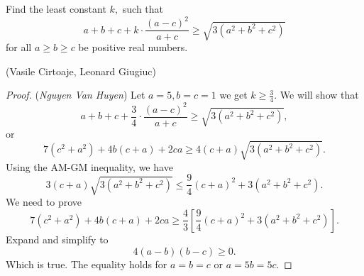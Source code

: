 \documentclass[12pt,a4paper]{book}
\begin{document}
\begin{pro_no_count}
Find the least constant $k,$ such that
$$a+b+c+k\cdot\frac{(a-c)^2}{a+c}\geq \sqrt{3(a^2+b^2+c^2)}$$
for all $a\ge b\ge c$ be positive real numbers.
\begin{flushright}(Vasile Cirtoaje, Leonard Giugiuc)\end{flushright}
\end{pro_no_count}

\begin{proof} (\textit{Nguyen Van Huyen}) Let $a=5,b=c=1$ we get $k \geqslant \frac34.$ We will show that
$$a+b+c+\frac34\cdot\frac{\left(a-c\right)^2}{a+c}\geq\sqrt{3\left(a^2+b^2+c^2\right)},$$
or
\[7(c^2+a^2)+4b(c+a)+2ca \geqslant 4(c+a)\sqrt{3(a^2+b^2+c^2)}.\]
Using the AM-GM inequality, we have
\[3(c+a)\sqrt{3(a^2+b^2+c^2)} \leqslant \frac94(c+a)^2+3(a^2+b^2+c^2).\]
We need to prove
\[7(c^2+a^2)+4b(c+a)+2ca \geqslant \frac{4}{3}\left[\frac94(c+a)^2+3(a^2+b^2+c^2)\right].\]
Expand and simplify to
\[4(a-b)(b-c) \geqslant 0.\]
Which is true. The equality holds for $a=b=c$ or $a=5b=5c.$
\end{proof}
\end{document}
